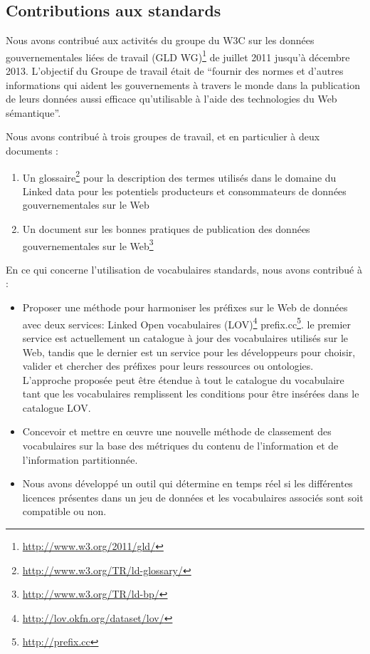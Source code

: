 \subsection{Contributions aux standards}
\label{sec:contrib-standard}
Nous avons contribu\'{e} aux activit\'{e}s du groupe du W3C sur les donn\'{e}es gouvernementales li\'{e}es de travail (GLD WG)\footnote{\url{http://www.w3.org/2011/gld/}} de juillet 2011 jusqu'à d\'{e}cembre 2013. L'objectif du Groupe de travail \'{e}tait de ``fournir des normes et d'autres informations qui aident les gouvernements à travers le monde dans la publication de leurs donn\'{e}es aussi efficace qu'utilisable à l'aide des technologies du Web s\'{e}mantique''.

Nous avons contribu\'{e} à trois groupes de travail, et en particulier à deux documents :
\begin{enumerate}
 \item Un glossaire\footnote{\url{http://www.w3.org/TR/ld-glossary/}} pour la description des termes utilis\'{e}s dans le domaine du Linked data pour les potentiels producteurs et consommateurs de donn\'{e}es gouvernementales sur le Web
 \item Un document sur les bonnes pratiques de publication des donn\'{e}es gouvernementales sur le Web\footnote{\url{http://www.w3.org/TR/ld-bp/}}
\end{enumerate}

En ce qui concerne l'utilisation de vocabulaires standards, nous avons contribu\'{e} à :
\begin{itemize}
 \item Proposer une m\'{e}thode pour harmoniser les pr\'{e}fixes sur le Web de donn\'{e}es avec deux services: Linked Open vocabulaires (LOV)\footnote{\url{http://lov.okfn.org/dataset/lov/}} prefix.cc\footnote{\url{http://prefix.cc}}. le premier service est actuellement un catalogue à jour des vocabulaires utilis\'{e}s sur le Web, tandis que le dernier est un service pour les d\'{e}veloppeurs pour choisir, valider et chercher des pr\'{e}fixes pour leurs ressources ou ontologies. L'approche propos\'{e}e peut \^{e}tre \'{e}tendue à tout le catalogue du vocabulaire tant que les vocabulaires remplissent les conditions pour \^{e}tre ins\'{e}r\'{e}es dans le catalogue LOV.
 \item Concevoir et mettre en œuvre une nouvelle m\'{e}thode de classement des vocabulaires sur la base des m\'{e}triques du contenu de l'information et de l'information partitionn\'{e}e.
 \item Nous avons d\'{e}velopp\'{e} un outil qui d\'{e}termine en temps r\'{e}el si les diff\'{e}rentes licences pr\'{e}sentes dans un jeu de donn\'{e}es et les vocabulaires associ\'{e}s sont soit compatible ou non.
\end{itemize}

